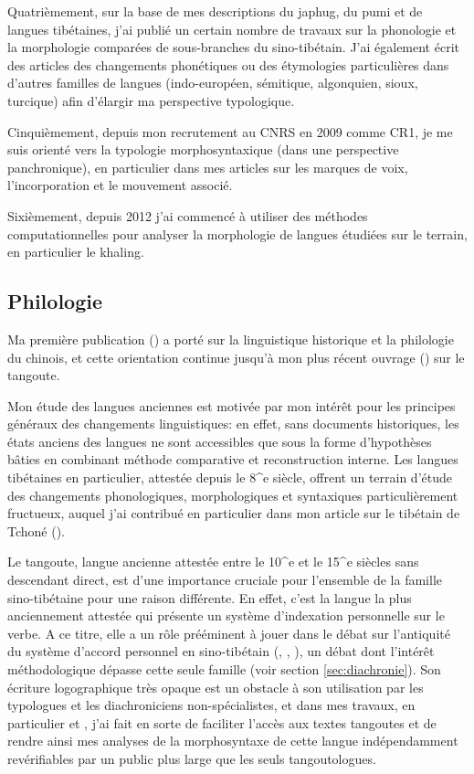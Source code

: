 \documentclass[oldfontcommands,oneside,a4paper,11pt]{article}
\begin{document}
Quatrièmement, sur la base de mes descriptions du japhug, du pumi et de langues tibétaines, j'ai publié un certain nombre de travaux sur la phonologie et la morphologie comparées de sous-branches du sino-tibétain. J'ai également écrit des articles des changements phonétiques ou des étymologies particulières dans d'autres familles de langues (indo-européen, sémitique, algonquien, sioux, turcique) afin d'élargir ma perspective typologique.

Cinquièmement, depuis mon recrutement au CNRS en 2009 comme CR1, je me suis orienté vers la typologie morphosyntaxique (dans une perspective panchronique),  en particulier dans mes articles sur les marques de voix, l'incorporation et le mouvement associé.

Sixièmement, depuis 2012 j'ai commencé à utiliser des méthodes computationnelles pour analyser la morphologie de langues étudiées sur le terrain, en particulier le khaling.

\subsection{Philologie} \label{sec:philologie}
Ma première publication (\citealt{jacques00ywij}) a porté sur la linguistique historique et la philologie du chinois, et cette orientation continue jusqu'à mon plus récent ouvrage (\citealt{jacques14esquisse}) sur le tangoute.

Mon étude des langues anciennes est motivée par mon intérêt pour les principes généraux des changements linguistiques: en effet, sans documents historiques, les états anciens des langues ne sont accessibles que sous la forme d'hypothèses bâties en combinant méthode comparative et reconstruction interne. Les langues tibétaines en particulier, attestée depuis le 8^e siècle, offrent un terrain d'étude des changements phonologiques, morphologiques et syntaxiques particulièrement fructueux, auquel j'ai contribué en particulier dans mon article sur le tibétain de Tchoné (\citealt{jacques14cone}).

Le tangoute, langue ancienne attestée entre le 10^{e} et le 15^e siècles sans descendant direct, est d'une importance cruciale pour l'ensemble de la famille sino-tibétaine pour une raison différente. En effet, c'est la langue la plus anciennement attestée qui présente un système d'indexation personnelle sur le verbe. A ce titre, elle a un rôle prééminent à jouer dans le débat sur l'antiquité du système d'accord personnel en sino-tibétain (\citealt{jacques09tangutverb}, \citealt{jacques10zos}, \citealt{jacques11tangut.verb}), un débat dont l'intérêt méthodologique dépasse cette seule famille (voir section \ref{sec:diachronie}). Son écriture logographique très opaque est un obstacle à son utilisation par les typologues et les diachroniciens non-spécialistes, et dans mes travaux, en particulier \citet{jacques07textes} et \citet{jacques14esquisse}, j'ai fait en sorte de faciliter l'accès aux textes tangoutes et de rendre ainsi mes analyses de la morphosyntaxe de cette langue indépendamment revérifiables par un public plus large que les seuls tangoutologues.
\end{document}
